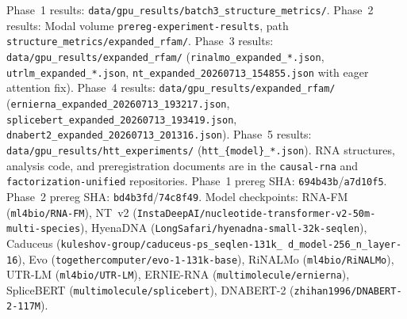 \documentclass[11pt]{article}
\begin{document}
Phase~1 results: \texttt{data/gpu\_results/batch3\_structure\_metrics/}.
Phase~2 results: Modal volume \texttt{prereg-experiment-results},
path \texttt{structure\_metrics/expanded\_rfam/}.
Phase~3 results: \texttt{data/gpu\_results/expanded\_rfam/}
(\texttt{rinalmo\_expanded\_*.json}, \texttt{utrlm\_expanded\_*.json},
\texttt{nt\_expanded\_20260713\_154855.json} with eager attention fix).
Phase~4 results: \texttt{data/gpu\_results/expanded\_rfam/}
(\texttt{ernierna\_expanded\_20260713\_193217.json},
\texttt{splicebert\_expanded\_20260713\_193419.json},
\texttt{dnabert2\_expanded\_20260713\_201316.json}).
Phase~5 results: \texttt{data/gpu\_results/htt\_experiments/}
(\texttt{htt\_\{model\}\_*.json}).
RNA structures, analysis code, and preregistration documents are in
the \texttt{causal-rna} and \texttt{factorization-unified}
repositories.
Phase~1 prereg SHA: \texttt{694b43b}/\texttt{a7d10f5}.
Phase~2 prereg SHA: \texttt{bd4b3fd}/\texttt{74c8f49}.
Model checkpoints: RNA-FM (\texttt{ml4bio/RNA-FM}), NT~v2
(\texttt{InstaDeepAI/nucleotide-transformer-v2-50m-multi-species}),
HyenaDNA (\texttt{LongSafari/hyenadna-small-32k-seqlen}),
Caduceus (\texttt{kuleshov-group/caduceus-ps\_seqlen-131k\_%
d\_model-256\_n\_layer-16}),
Evo (\texttt{togethercomputer/evo-1-131k-base}),
RiNALMo (\texttt{ml4bio/RiNALMo}),
UTR-LM (\texttt{ml4bio/UTR-LM}),
ERNIE-RNA (\texttt{multimolecule/ernierna}),
SpliceBERT (\texttt{multimolecule/splicebert}),
DNABERT-2 (\texttt{zhihan1996/DNABERT-2-117M}).



\end{document}
